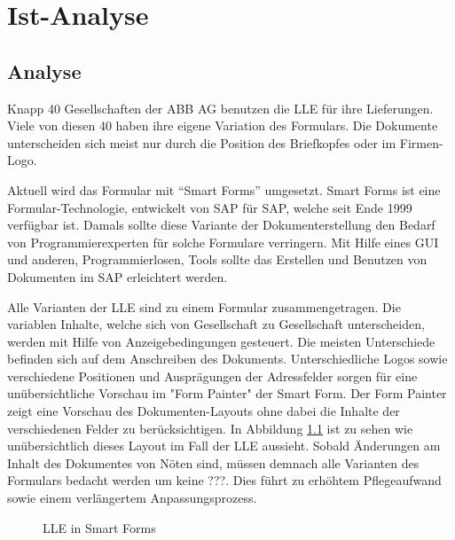 \chapter{Ist-Analyse}
\label{ch:Ist-Analyse}


	

	\section{Analyse}
	Knapp 40 Gesellschaften der ABB AG benutzen die \ac{LLE} für ihre Lieferungen. Viele von diesen 40 haben ihre eigene Variation des Formulars. Die Dokumente unterscheiden sich meist nur durch die Position des Briefkopfes oder im Firmen-Logo. 
	
	Aktuell wird das Formular mit "`Smart Forms"' umgesetzt. Smart Forms ist eine Formular-Technologie, entwickelt von SAP für SAP, welche seit Ende 1999 verfügbar ist. Damals sollte diese Variante der Dokumenterstellung den Bedarf von Programmierexperten für solche Formulare verringern. Mit Hilfe eines \ac{GUI} und anderen, Programmierlosen, Tools sollte das Erstellen und Benutzen von Dokumenten im SAP erleichtert werden.  
	
	Alle Varianten der \ac{LLE} sind zu einem Formular zusammengetragen. Die variablen Inhalte, welche sich von Gesellschaft zu Gesellschaft unterscheiden, werden mit Hilfe von Anzeigebedingungen gesteuert. Die meisten Unterschiede befinden sich auf dem Anschreiben des Dokuments. Unterschiedliche Logos sowie verschiedene Positionen und Ausprägungen der Adressfelder sorgen für eine unübersichtliche Vorschau im "Form Painter" der Smart Form. Der Form Painter zeigt eine Vorschau des Dokumenten-Layouts ohne dabei die Inhalte der verschiedenen Felder zu berücksichtigen.
	In Abbildung \ref{fig2} ist zu sehen wie unübersichtlich dieses Layout im Fall der \ac{LLE} aussieht. Sobald Änderungen am Inhalt des Dokumentes von Nöten sind, müssen demnach alle Varianten des Formulars bedacht werden um keine ???. Dies führt zu erhöhtem Pflegeaufwand sowie einem verlängertem Anpassungsprozess.
	
	\begin{figure}[ht]
		\centering
		\caption{\ac{LLE} in Smart Forms}
		\label{fig2}
	\end{figure}
	
